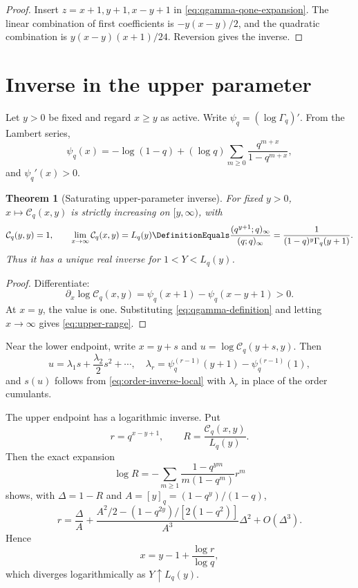 \documentclass[11pt,a4paper,oneside,openany]{book}
\newtheorem{theorem}{Theorem}[chapter]
\theoremstyle{definition}
\theoremstyle{remark}
\begin{document}
\begin{proof}
Insert \(z=x+1,y+1,x-y+1\) in
\eqref{eq:qgamma-qone-expansion}.  The linear combination of first
coefficients is \(-y(x-y)/2\), and the quadratic combination is
\(y(x-y)(x+1)/24\).  Reversion gives the inverse.
\end{proof}

\section{Inverse in the upper parameter}

Let \(y>0\) be fixed and regard \(x\ge y\) as active.  Write
\(\psi_q=(\log\Gamma_q)'\).  From the Lambert series,
\begin{equation}\label{eq:qpsi}
 \psi_q(x)=-\log(1-q)+(\log q)
 \sum_{m\ge0}\frac{q^{m+x}}{1-q^{m+x}},
\end{equation}
and \(\psi_q'(x)>0\).

\begin{theorem}[Saturating upper-parameter inverse]\label{thm:continuous-upper-inverse}
For fixed \(y>0\), \(x\mapsto\mathcal C_q(x,y)\) is strictly increasing on
\([y,\infty)\), with
\begin{equation}\label{eq:upper-range}
 \mathcal C_q(y,y)=1,
 \qquad
 \lim_{x\to\infty}\mathcal C_q(x,y)
 =L_q(y)\DefinitionEquals\frac{(q^{y+1};q)_\infty}{(q;q)_\infty}
 =\frac1{(1-q)^y\Gamma_q(y+1)}.
\end{equation}
Thus it has a unique real inverse for \(1<Y<L_q(y)\).
\end{theorem}

\begin{proof}
Differentiate:
\[
 \partial_x\log\mathcal C_q(x,y)
 =\psi_q(x+1)-\psi_q(x-y+1)>0.
\]
At \(x=y\), the value is one.  Substituting
\eqref{eq:qgamma-definition} and letting \(x\to\infty\) gives
\eqref{eq:upper-range}.
\end{proof}

Near the lower endpoint, write \(x=y+s\) and
\(u=\log\mathcal C_q(y+s,y)\).  Then
\begin{equation}\label{eq:upper-near-y-forward}
 u=\lambda_1s+\frac{\lambda_2}{2}s^2+\cdots,
 \quad
 \lambda_r=\psi_q^{(r-1)}(y+1)-\psi_q^{(r-1)}(1),
\end{equation}
and \(s(u)\) follows from \eqref{eq:order-inverse-local} with
\(\lambda_r\) in place of the order cumulants.

The upper endpoint has a logarithmic inverse.  Put
\[
 r=q^{x-y+1},\qquad R=\frac{\mathcal C_q(x,y)}{L_q(y)}.
\]
Then the exact expansion
\begin{equation}\label{eq:continuous-upper-ratio}
 \log R=-\sum_{m\ge1}
 \frac{1-q^{ym}}{m(1-q^m)}r^m
\end{equation}
shows, with \(\Delta=1-R\) and
\(A=[y]_q=(1-q^y)/(1-q)\),
\begin{equation}\label{eq:r-from-delta-upper}
 r=\frac{\Delta}{A}
 +\frac{A^2/2-(1-q^{2y})/[2(1-q^2)]}{A^3}\Delta^2
 +O(\Delta^3).
\end{equation}
Hence
\begin{equation}\label{eq:x-upper-endpoint}
 x=y-1+\frac{\log r}{\log q},
\end{equation}
which diverges logarithmically as \(Y\uparrow L_q(y)\).
\end{document}
